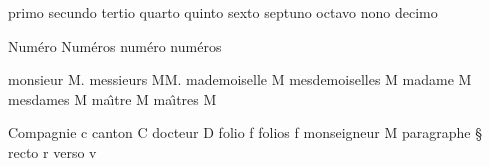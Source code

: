 primo               \noexpand{}%
secundo             \noexpand{}%
tertio              \noexpand{}%
quarto              \noexpand{}%
quinto              \noexpand{}%
sexto               \noexpand{}%
septuno             \noexpand{}%
octavo              \noexpand{}%
nono                \noexpand{}%
decimo              \noexpand{}%

{Num\'{e}ro}            \noexpand\Numero%
{Num\'{e}ros}           \noexpand\Numeros%
num\'{e}ro              \noexpand\numero%
num\'{e}ros             \noexpand\numeros%

monsieur            M.%
messieurs           MM.%
mademoiselle        M\noexpand{}%
mesdemoiselles      M\noexpand{}%
madame              M\noexpand{}%
mesdames            M\noexpand{}%
ma\^{\i}tre              M\noexpand{}%
ma\^{\i}tres             M\noexpand{}%

{Compagnie}         c\noexpand{}%
canton              C\noexpand{}%
docteur             D\noexpand{}%
folio               f\noexpand{}%
folios              f\noexpand{}%
monseigneur         M\noexpand{}%
paragraphe          \noexpand\S~%
recto               r\noexpand{}%
verso               v\noexpand{}%

